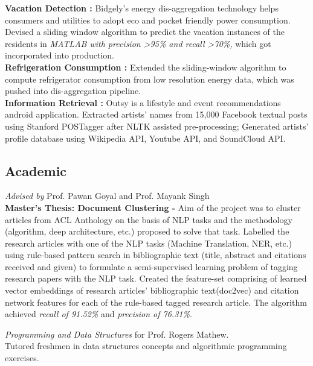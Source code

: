 \documentclass[11pt,a4paper,sans]{moderncv}        %
\begin{document}
{\textbf{Vacation Detection : }Bidgely's energy dis-aggregation technology helps consumers and utilities to adopt eco and pocket friendly power consumption. Devised a sliding window algorithm to predict the vacation instances of the residents in \textit{MATLAB with precision \textgreater95\% and recall \textgreater70\%,} which got incorporated into production.
\vspace{3} \\ 
\textbf{Refrigeration Consumption : }Extended the sliding-window algorithm to compute refrigerator consumption from low resolution energy data, which was pushed into dis-aggregation pipeline. \\}
{\textbf{Information Retrieval : }Outsy is a lifestyle and event recommendations android application. Extracted artists' names from 15,000 Facebook textual posts using Stanford POSTagger after NLTK assisted pre-processing; Generated artists' profile database using Wikipedia API, Youtube API, and SoundCloud API.}
\vspace{3} \\ 
\subsection{Academic}
{\textit{Advised by } Prof. Pawan Goyal and Prof. Mayank Singh\\
\textbf{Master's Thesis: Document Clustering -} Aim of the project was to cluster articles from ACL Anthology on the basis of NLP tasks and the methodology (algorithm, deep architecture, etc.) proposed to solve that task. 
Labelled the research articles with one of the NLP tasks (Machine Translation, NER, etc.) using rule-based pattern search in bibliographic text (title, abstract and citations received and given) to formulate a semi-supervised learning problem of tagging research papers with the NLP task. Created the feature-set comprising of learned vector embeddings of research articles’ bibliographic text(doc2vec) and citation network features for each of the rule-based tagged research article. The algorithm achieved \textit{recall of 91.52\%} and \textit{precision of 76.31\%}. }


{\textit{Programming and Data Structures} for Prof. Rogers Mathew.\\
Tutored freshmen in data structures concepts and algorithmic programming exercises.\\}
\end{document}
